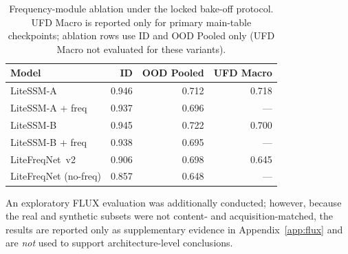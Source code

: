 \begin{table}[H]
\caption{Frequency-module ablation under the locked bake-off protocol.
UFD Macro is reported only for primary main-table checkpoints; ablation rows use ID and OOD Pooled only (UFD Macro not evaluated for these variants).\label{tab:freq-abl}}
\scriptsize
\setlength{\tabcolsep}{4pt}
\begin{tabularx}{\textwidth}{@{}P{3.2cm}*{3}{R}@{}}
\toprule
\textbf{Model} & \textbf{ID} & \textbf{OOD Pooled} & \textbf{UFD Macro} \\
\midrule
LiteSSM-A & 0.946 & 0.712 & 0.718 \\
LiteSSM-A + freq & 0.937 & 0.696 & --- \\
LiteSSM-B & 0.945 & 0.722 & 0.700 \\
LiteSSM-B + freq & 0.938 & 0.695 & --- \\
LiteFreqNet~v2 & 0.906 & 0.698 & 0.645 \\
LiteFreqNet (no-freq) & 0.857 & 0.648 & --- \\
\bottomrule
\end{tabularx}
\end{table}

An exploratory FLUX evaluation was additionally conducted; however, because the real and synthetic subsets were not content- and acquisition-matched, the results are reported only as supplementary evidence in Appendix~\ref{app:flux} and are \emph{not} used to support architecture-level conclusions.
